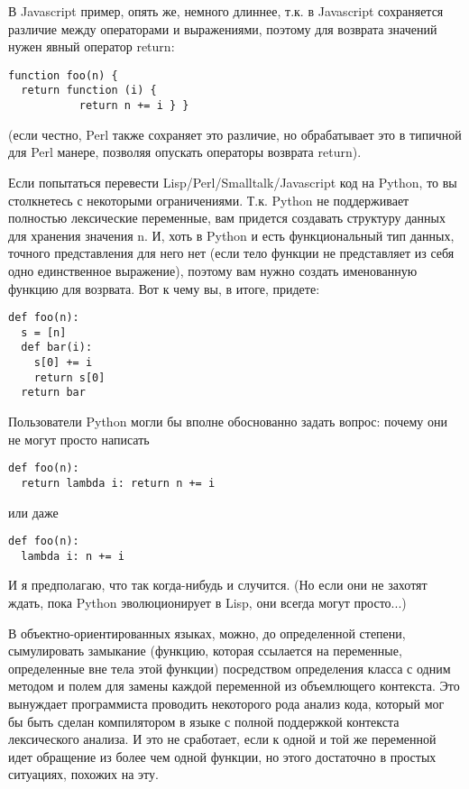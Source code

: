 \documentclass[ebook,12pt,oneside,openany]{memoir}
\begin{document}
В Javascript пример, опять же, немного длиннее, т.к. в Javascript
сохраняется различие между операторами и выражениями, поэтому для
возврата значений нужен явный оператор return:

\begin{verbatim}
function foo(n) {
  return function (i) {
           return n += i } }
\end{verbatim}

(если честно, Perl также сохраняет это различие, но обрабатывает это в
типичной для Perl манере, позволяя опускать операторы возврата
return).

Если попытаться перевести Lisp/Perl/Smalltalk/Javascript код на
Python, то вы столкнетесь с некоторыми ограничениями. Т.к. Python не
поддерживает полностью лексические переменные, вам придется создавать
структуру данных для хранения значения n. И, хоть в Python и есть
функциональный тип данных, точного представления для него нет (если
тело функции не представляет из себя одно единственное выражение),
поэтому вам нужно создать именованную функцию для возрвата. Вот к чему
вы, в итоге, придете:
\begin{verbatim}
def foo(n):
  s = [n]
  def bar(i):
    s[0] += i
    return s[0]
  return bar
\end{verbatim}

Пользователи Python могли бы вполне обоснованно задать вопрос: почему
они не могут просто написать
\begin{verbatim}
def foo(n):
  return lambda i: return n += i
\end{verbatim}

или даже
\begin{verbatim}
def foo(n):
  lambda i: n += i
\end{verbatim}

И я предполагаю, что так когда-нибудь и случится. (Но если они не
захотят ждать, пока Python эволюционирует в Lisp, они всегда могут
просто...)

В объектно-ориентированных языках, можно, до определенной степени,
сымулировать замыкание (функцию, которая ссылается на переменные,
определенные вне тела этой функции) посредством определения класса с
одним методом и полем для замены каждой переменной из объемлющего
контекста. Это вынуждает программиста проводить некоторого рода анализ
кода, который мог бы быть сделан компилятором в языке с полной
поддержкой контекста лексического анализа. И это не сработает, если к
одной и той же переменной идет обращение из более чем одной функции,
но этого достаточно в простых ситуациях, похожих на эту.
\end{document}
